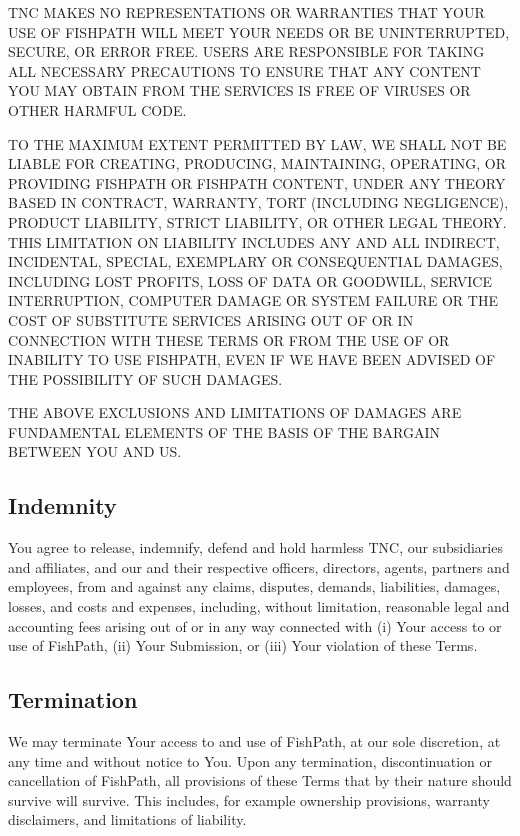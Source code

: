 \documentclass[11pt,]{book}
\begin{document}
TNC MAKES NO REPRESENTATIONS OR WARRANTIES THAT YOUR USE OF FISHPATH
WILL MEET YOUR NEEDS OR BE UNINTERRUPTED, SECURE, OR ERROR FREE. USERS
ARE RESPONSIBLE FOR TAKING ALL NECESSARY PRECAUTIONS TO ENSURE THAT ANY
CONTENT YOU MAY OBTAIN FROM THE SERVICES IS FREE OF VIRUSES OR OTHER
HARMFUL CODE.

TO THE MAXIMUM EXTENT PERMITTED BY LAW, WE SHALL NOT BE LIABLE FOR
CREATING, PRODUCING, MAINTAINING, OPERATING, OR PROVIDING FISHPATH OR
FISHPATH CONTENT, UNDER ANY THEORY BASED IN CONTRACT, WARRANTY, TORT
(INCLUDING NEGLIGENCE), PRODUCT LIABILITY, STRICT LIABILITY, OR OTHER
LEGAL THEORY. THIS LIMITATION ON LIABILITY INCLUDES ANY AND ALL
INDIRECT, INCIDENTAL, SPECIAL, EXEMPLARY OR CONSEQUENTIAL DAMAGES,
INCLUDING LOST PROFITS, LOSS OF DATA OR GOODWILL, SERVICE INTERRUPTION,
COMPUTER DAMAGE OR SYSTEM FAILURE OR THE COST OF SUBSTITUTE SERVICES
ARISING OUT OF OR IN CONNECTION WITH THESE TERMS OR FROM THE USE OF OR
INABILITY TO USE FISHPATH, EVEN IF WE HAVE BEEN ADVISED OF THE
POSSIBILITY OF SUCH DAMAGES.

THE ABOVE EXCLUSIONS AND LIMITATIONS OF DAMAGES ARE FUNDAMENTAL ELEMENTS
OF THE BASIS OF THE BARGAIN BETWEEN YOU AND US.

\hypertarget{indemnity}{%
\subsection*{Indemnity}\label{indemnity}}

You agree to release, indemnify, defend and hold harmless TNC, our
subsidiaries and affiliates, and our and their respective officers,
directors, agents, partners and employees, from and against any claims,
disputes, demands, liabilities, damages, losses, and costs and expenses,
including, without limitation, reasonable legal and accounting fees
arising out of or in any way connected with (i) Your access to or use of
FishPath, (ii) Your Submission, or (iii) Your violation of these Terms.

\hypertarget{termination}{%
\subsection*{Termination}\label{termination}}

We may terminate Your access to and use of FishPath, at our sole
discretion, at any time and without notice to You. Upon any termination,
discontinuation or cancellation of FishPath, all provisions of these
Terms that by their nature should survive will survive. This includes,
for example ownership provisions, warranty disclaimers, and limitations
of liability.
\end{document}
